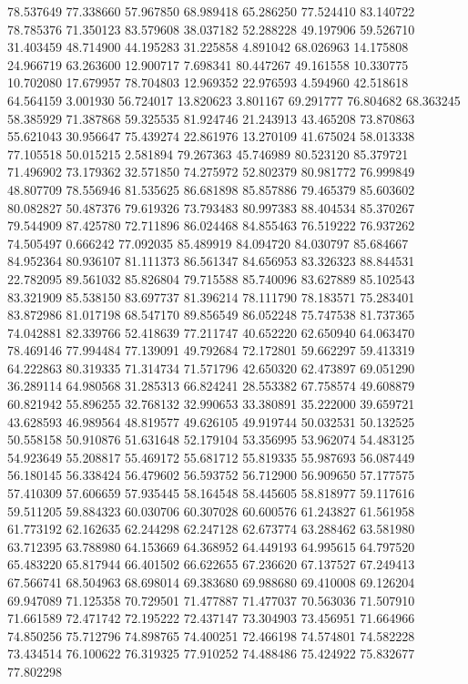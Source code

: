 78.537649
77.338660
57.967850
68.989418
65.286250
77.524410
83.140722
78.785376
71.350123
83.579608
38.037182
52.288228
49.197906
59.526710
31.403459
48.714900
44.195283
31.225858
4.891042
68.026963
14.175808
24.966719
63.263600
12.900717
7.698341
80.447267
49.161558
10.330775
10.702080
17.679957
78.704803
12.969352
22.976593
4.594960
42.518618
64.564159
3.001930
56.724017
13.820623
3.801167
69.291777
76.804682
68.363245
58.385929
71.387868
59.325535
81.924746
21.243913
43.465208
73.870863
55.621043
30.956647
75.439274
22.861976
13.270109
41.675024
58.013338
77.105518
50.015215
2.581894
79.267363
45.746989
80.523120
85.379721
71.496902
73.179362
32.571850
74.275972
52.802379
80.981772
76.999849
48.807709
78.556946
81.535625
86.681898
85.857886
79.465379
85.603602
80.082827
50.487376
79.619326
73.793483
80.997383
88.404534
85.370267
79.544909
87.425780
72.711896
86.024468
84.855463
76.519222
76.937262
74.505497
0.666242
77.092035
85.489919
84.094720
84.030797
85.684667
84.952364
80.936107
81.111373
86.561347
84.656953
83.326323
88.844531
22.782095
89.561032
85.826804
79.715588
85.740096
83.627889
85.102543
83.321909
85.538150
83.697737
81.396214
78.111790
78.183571
75.283401
83.872986
81.017198
68.547170
89.856549
86.052248
75.747538
81.737365
74.042881
82.339766
52.418639
77.211747
40.652220
62.650940
64.063470
78.469146
77.994484
77.139091
49.792684
72.172801
59.662297
59.413319
64.222863
80.319335
71.314734
71.571796
42.650320
62.473897
69.051290
36.289114
64.980568
31.285313
66.824241
28.553382
67.758574
49.608879
60.821942
55.896255
32.768132
32.990653
33.380891
35.222000
39.659721
43.628593
46.989564
48.819577
49.626105
49.919744
50.032531
50.132525
50.558158
50.910876
51.631648
52.179104
53.356995
53.962074
54.483125
54.923649
55.208817
55.469172
55.681712
55.819335
55.987693
56.087449
56.180145
56.338424
56.479602
56.593752
56.712900
56.909650
57.177575
57.410309
57.606659
57.935445
58.164548
58.445605
58.818977
59.117616
59.511205
59.884323
60.030706
60.307028
60.600576
61.243827
61.561958
61.773192
62.162635
62.244298
62.247128
62.673774
63.288462
63.581980
63.712395
63.788980
64.153669
64.368952
64.449193
64.995615
64.797520
65.483220
65.817944
66.401502
66.622655
67.236620
67.137527
67.249413
67.566741
68.504963
68.698014
69.383680
69.988680
69.410008
69.126204
69.947089
71.125358
70.729501
71.477887
71.477037
70.563036
71.507910
71.661589
72.471742
72.195222
72.437147
73.304903
73.456951
71.664966
74.850256
75.712796
74.898765
74.400251
72.466198
74.574801
74.582228
73.434514
76.100622
76.319325
77.910252
74.488486
75.424922
75.832677
77.802298
